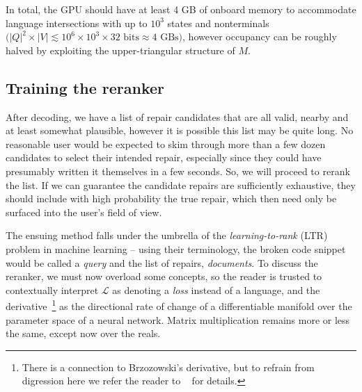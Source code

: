 \documentclass[popl.tex]{subfiles}
\begin{document}
In total, the GPU should have at least 4 GB of onboard memory to accommodate language intersections with up to $10^3$ states and nonterminals $\big(|Q|^2\times|V| \lesssim 10^6\times10^3\times 32 \text{ bits} \approx \text{4 GBs}\big)$, however occupancy can be roughly halved by exploiting the upper-triangular structure of $M$.

\clearpage\subsection{Training the reranker}\label{sec:training}

After decoding, we have a list of repair candidates that are all valid, nearby and at least somewhat plausible, however it is possible this list may be quite long. No reasonable user would be expected to skim through more than a few dozen candidates to select their intended repair, especially since they could have presumably written it themselves in a few seconds. So, we will proceed to rerank the list. If we can guarantee the candidate repairs are sufficiently exhaustive, they should include with high probability the true repair, which then need only be surfaced into the user's field of view.

The ensuing method falls under the umbrella of the \textit{learning-to-rank} (LTR) problem in machine learning -- using their terminology, the broken code snippet would be called a \textit{query} and the list of repairs, \textit{documents}. To discuss the reranker, we must now overload some concepts, so the reader is trusted to contextually interpret $\mathcal{L}$ as denoting a \textit{loss} instead of a language, and the derivative~\footnote{There is a connection to Brzozowski's derivative, but to refrain from digression here we refer the reader to ~\cite{elliott2019generalized} for details.} as the directional rate of change of a differentiable manifold over the parameter space of a neural network. Matrix multiplication remains more or less the same, except now over the reals.
\end{document}
